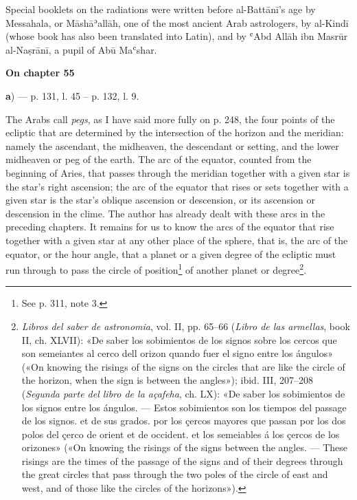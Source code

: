 \documentclass[11pt]{article}
\newcommand{\Pg}[1]{\marginpar{\footnotesize\color{gray}#1}}
\newcommand{\UnitHead}[2]{\par\setcounter{footnoteT}{0}\needspace{8\baselineskip}\bigskip\pdfbookmark[1]{#1}{unit-#2}\hypertarget{EN-#2}{}%
 {\large\bfseries\interlinepenalty=10000 #1\par}\nobreak\medskip}
\begin{document}
\par \Pg{I 313}Special booklets on the radiations were written before al-Battānī's age by Messahala, or Māshāʾallāh, one of the most ancient Arab astrologers, by al-Kindī (whose book has also been translated into Latin), and by ʿAbd Allāh ibn Masrūr al-Naṣrānī, a pupil of Abū Maʿshar.\par
\UnitHead{On chapter 55}{A55}
\par\begin{center}\textbf{a}) — p. 131, l. 45 – p. 132, l. 9.\end{center}
\par The Arabs call \emph{pegs}, as I have said more fully on p. 248, the four points of the ecliptic that are determined by the intersection of the horizon and the meridian: namely the ascendant, the midheaven, the descendant or setting, and the lower midheaven or peg of the earth. The arc of the equator, counted from the beginning of Aries, that passes through the meridian together with a given star is the star's right ascension; the arc of the equator that rises or sets together with a given star is the star's oblique ascension or descension, or its ascension or descension in the clime. The author has already dealt with these arcs in the preceding chapters. It remains for us to know the arcs of the equator that rise together with a given star at any other place of the sphere, that is, the arc of the equator, or the hour angle, that a planet or a given degree of the ecliptic must run through to pass the circle of position\footnote{See p. 311, note 3.} of another planet or degree\footnote{\emph{Libros del saber de astronomia}, vol. II, pp. 65–66 (\emph{Libro de las armellas}, book II, ch. XLVII): «De saber los sobimientos de los signos sobre los cercos que son semeiantes al cerco dell orizon quando fuer el signo entre los ángulos» («On knowing the risings of the signs on the circles that are like the circle of the horizon, when the sign is between the angles»); ibid. III, 207–208 (\emph{Segunda parte del libro de la açafeha}, ch. LX): «De saber los sobimientos de los signos entre los ángulos. — Estos sobimientos son los tiempos del passage de los signos. et de sus grados. por los çercos mayores que passan por los dos polos del çerco de orient et de occident. et los semeiables á los çercos de los orizones» («On knowing the risings of the signs between the angles. — These risings are the times of the passage of the signs and of their degrees through the great circles that pass through the two poles of the circle of east and west, and of those like the circles of the horizons»).}.\par
\end{document}
